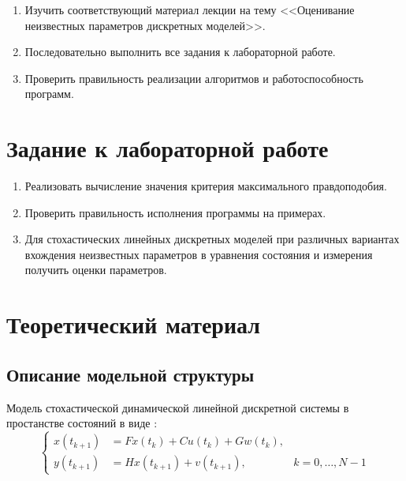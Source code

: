 \documentclass[a4paper,14pt]{extarticle}
\renewcommand{\vec}[1]{#1}
\begin{document}
\begin{enumerate}
\item Изучить соответствующий материал лекции на тему <<Оценивание
  неизвестных параметров дискретных моделей>>.

\item Последовательно выполнить все задания к лабораторной работе.

\item Проверить правильность реализации алгоритмов и работоспособность
  программ.

\end{enumerate}

\section{Задание к лабораторной работе}

\begin{enumerate}

\item Реализовать вычисление значения критерия максимального
  \mbox{правдоподобия}.

\item Проверить правильность исполнения программы на примерах.

\item Для стохастических линейных дискретных моделей при различных
  вариантах вхождения неизвестных параметров в уравнения состояния и измерения
  получить оценки параметров.

\end{enumerate}

\newpage

\section{Теоретический материал}

\subsection{Описание модельной структуры}

Модель стохастической динамической линейной дискретной системы в простанстве
состояний в виде \cite{mono}:
\begin{equation}
  \label{eq:initmod}
  \left\{ 
    \begin{array}{lll}
      \vec{x}(t_{k+1}) &= F \vec{x}(t_k) + C \vec{u}(t_k) + G \vec{w}(t_k),&\\
      \vec{y}(t_{k+1}) &= H \vec{x}(t_{k+1}) + \vec{v}(t_{k+1}), 
      & k = 0,\ldots, N-1
    \end{array} 
  \right. 
\end{equation}
\end{document}
